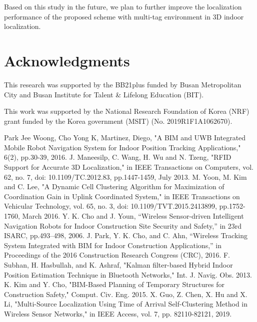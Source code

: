 \documentclass[conference]{IEEEtran}
\begin{document}
Based on this study in the future, we plan to further improve the localization performance of the proposed scheme with multi-tag environment in 3D indoor localization.

\section*{Acknowledgments}

This research was supported by the BB21plus funded by Busan Metropolitan City and Busan Institute for Talent \& Lifelong Education (BIT).

This work was supported by the National Research Foundation of Korea (NRF) grant funded by the Korea government (MSIT) (No. 2019R1F1A1062670).

\begin{thebibliography}{00}
     Park Jee Woong, Cho Yong K, Martinez, Diego, "A BIM and UWB Integrated Mobile Robot Navigation System for Indoor Position Tracking Applications," 6(2), pp.30-39, 2016.
     J. Maneesilp, C. Wang, H. Wu and N. Tzeng, "RFID Support for Accurate 3D Localization," in IEEE Transactions on Computers, vol. 62, no. 7, doi: 10.1109/TC.2012.83, pp.1447-1459, July 2013.
     M. Yoon, M. Kim and C. Lee, "A Dynamic Cell Clustering Algorithm for Maximization of Coordination Gain in Uplink Coordinated System," in IEEE Transactions on Vehicular Technology, vol. 65, no. 3, doi: 10.1109/TVT.2015.2413899, pp.1752-1760, March 2016.
     Y. K. Cho and J. Youn, “Wireless Sensor-driven Intelligent Navigation Robots for Indoor Construction Site Security and Safety,” in 23rd ISARC, pp.493–498, 2006.
     J. Park, Y. K. Cho, and C. Ahn, “Wireless Tracking System Integrated with BIM for Indoor Construction Applications,” in Proceedings of the 2016 Construction Research Congress (CRC), 2016.
     F. Subhan, H. Hasbullah, and K. Ashraf, "Kalman filter-based Hybrid Indoor Position Estimation Technique in Bluetooth Networks," Int. J. Navig. Obs. 2013.
     K. Kim and Y. Cho, "BIM-Based Planning of Temporary Structures for Construction Safety," Comput. Civ. Eng. 2015.
     X. Guo, Z. Chen, X. Hu and X. Li, "Multi-Source Localization Using Time of Arrival Self-Clustering Method in Wireless Sensor Networks," in IEEE Access, vol. 7, pp. 82110-82121, 2019.
\end{thebibliography}
\end{document}

